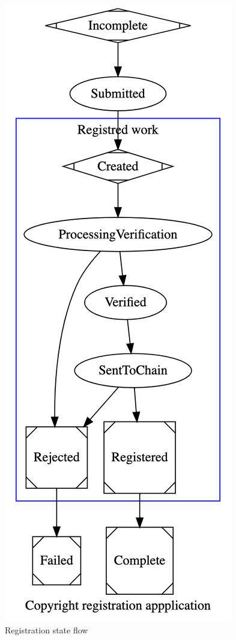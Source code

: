 \begin{figure}[H]
\caption{Registration state flow}
\centering
\includegraphics[width=\textwidth,height=0.5\textheight,keepaspectratio]{images/operational/cpy-registration-status-graph}
\end{figure}

